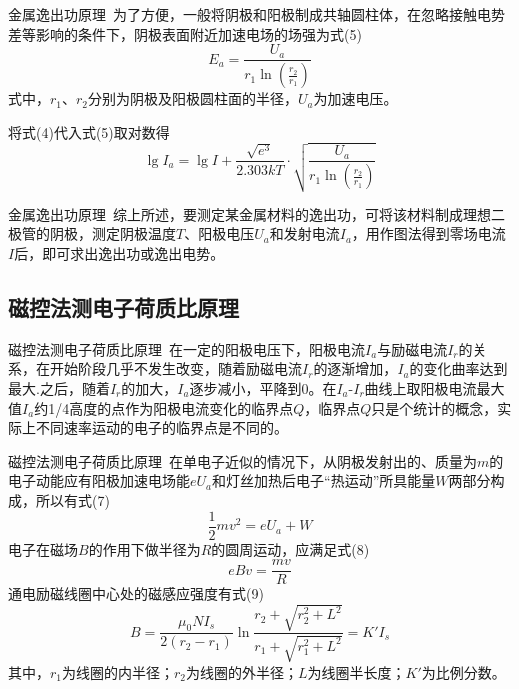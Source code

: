 \documentclass{beamer}
\begin{document}
    \begin{frame}{金属逸出功原理}{\thesubsection \, \subsecname}
        为了方便，一般将阴极和阳极制成共轴圆柱体，在忽略接触电势差等影响的条件下，阴极表面附近加速电场的场强为式(5)
        \begin{equation}
            E_a = \frac{U_a}{r_1\ln(\frac{r_2}{r_1})}
        \end{equation}
        式中，$r_1$、$r_2$分别为阴极及阳极圆柱面的半径，$U_a$为加速电压。

        将式(4)代入式(5)取对数得
        \begin{equation}
            \lg I_a = \lg I + \frac{\sqrt{e^3}}{2.303kT}\cdot \sqrt{\frac{U_a}{r_1\ln(\frac{r_2}{r_1})}}
        \end{equation}
    \end{frame}

    \begin{frame}{金属逸出功原理}{\thesubsection \, \subsecname}
        综上所述，要测定某金属材料的逸出功，可将该材料制成理想二极管的阴极，测定阴极温度$T$、阳极电压$U_a$和发射电流$I_a$，用作图法得到零场电流$I$后，即可求出逸出功或逸出电势。
    \end{frame}

    \subsection{磁控法测电子荷质比原理}

    \begin{frame}{磁控法测电子荷质比原理}{\thesubsection \, \subsecname}
        在一定的阳极电压下，阳极电流$I_a$与励磁电流$I_r$的关系，在开始阶段几乎不发生改变，随着励磁电流$I_r$的逐渐增加，$I_a$的变化曲率达到最大.之后，随着$I_r$的加大，$I_a$逐步减小，平降到0。在$I_a$-$I_r$曲线上取阳极电流最大值$I_a$约1/4高度的点作为阳极电流变化的临界点$Q$，临界点$Q$只是个统计的概念，实际上不同速率运动的电子的临界点是不同的。
    \end{frame}

    \begin{frame}{磁控法测电子荷质比原理}{\thesubsection \, \subsecname}
        在单电子近似的情况下，从阴极发射出的、质量为$m$的电子动能应有阳极加速电场能$eU_a$和灯丝加热后电子“热运动”所具能量$W$两部分构成，所以有式(7)
        \begin{equation}
            \frac{1}{2}mv^2 = eU_a + W
        \end{equation}
        电子在磁场$B$的作用下做半径为$R$的圆周运动，应满足式(8)
        \begin{equation}
            eBv = \frac{mv}{R}
        \end{equation}
        通电励磁线圈中心处的磁感应强度有式(9)
        \begin{equation}
            B = \frac{\mu_0NI_s}{2(r_2-r_1)}\ln \frac{r_2+\sqrt{r_2^2+L^2}}{r_1+\sqrt{r_1^2+L^2}} = K'I_s
        \end{equation}
        其中，$r_1$为线圈的内半径；$r_2$为线圈的外半径；$L$为线圈半长度；$K'$为比例分数。
    \end{frame}
\end{document}
